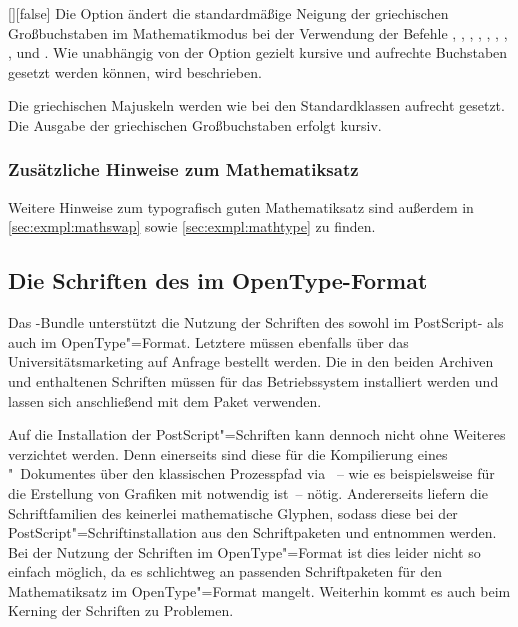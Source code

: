 \begin{Declaration}{[\PBoolean]}[false]
\printdeclarationlist%
%
Die Option ändert die standardmäßige Neigung der griechischen Großbuchstaben im 
Mathematikmodus bei der Verwendung der Befehle , , 
, , , , , 
,  und . Wie unabhängig von der Option 
 gezielt kursive und aufrechte Buchstaben gesetzt werden 
können, wird  beschrieben.
%
\begin{values}
\itemfalse
  Die griechischen Majuskeln werden wie bei den Standardklassen aufrecht 
  gesetzt.
\itemtrue*
  Die Ausgabe der griechischen Großbuchstaben erfolgt kursiv.
\end{values}
\end{Declaration}


\subsubsection{Zusätzliche Hinweise zum Mathematiksatz}
Weitere Hinweise zum typografisch guten Mathematiksatz sind außerdem in 
\autoref{sec:exmpl:mathswap} sowie \autoref{sec:exmpl:mathtype} zu finden.


\subsection{Die Schriften des \CDs im OpenType-Format}
\label{sec:fonts:fontspec}
%
Das \TUDScript-Bundle unterstützt die Nutzung der Schriften des \CDs sowohl 
im PostScript- als auch im OpenType"=Format. Letztere müssen ebenfalls über das 
%
{Universitätsmarketing auf Anfrage} bestellt werden. Die in den beiden Archiven 
 und  enthaltenen Schriften müssen 
für das Betriebssystem installiert werden und lassen sich anschließend mit dem 
Paket  verwenden.

Auf die Installation der PostScript"=Schriften kann dennoch nicht ohne Weiteres 
verzichtet werden. Denn einerseits sind diese für die Kompilierung eines 
"~Dokumentes über den klassischen Prozesspfad via
~-- wie es 
beispielsweise für die Erstellung von Grafiken mit  notwendig 
ist~-- nötig. Andererseits liefern die Schriftfamilien des \CDs keinerlei 
mathematische Glyphen, sodass diese bei der PostScript"=Schriftinstallation aus 
den Schriftpaketen  und  entnommen werden. Bei 
der Nutzung der Schriften im OpenType"=Format ist dies leider nicht so einfach 
möglich, da es schlichtweg an passenden Schriftpaketen für den Mathematiksatz 
im OpenType"=Format mangelt. Weiterhin kommt es auch beim Kerning der Schriften 
zu Problemen.

